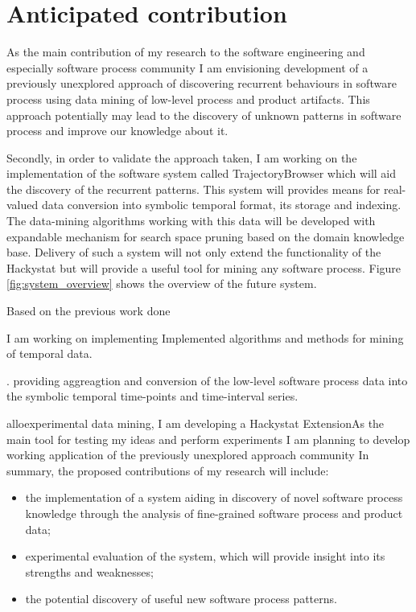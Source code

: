 \chapter{Anticipated contribution} \label{contribution}
As the main contribution of my research to the software engineering and especially software process community I am envisioning development of a previously unexplored approach of discovering recurrent behaviours in software process using data mining of low-level process and product artifacts. This approach potentially may lead to the discovery of unknown patterns in software process and improve our knowledge about it.

Secondly, in order to validate the approach taken, I am working on the implementation of the software system called TrajectoryBrowser which will aid the discovery of the recurrent patterns. This system will provides means for real-valued data conversion into symbolic temporal format, its storage and indexing. The data-mining algorithms working with this data will be developed with expandable mechanism for search space pruning based on the domain knowledge base. Delivery of such a system will not only extend the functionality of the Hackystat but will provide a useful tool for mining any software process. Figure \ref{fig:system_overview} shows the overview of the future system.

Based on the previous work done 





I am working on implementing Implemented algorithms and methods for mining of temporal data. 

. providing aggreagtion and conversion of the low-level software process data into the symbolic temporal time-points and time-interval series. 


alloexperimental data mining, I am developing a Hackystat ExtensionAs the main tool for testing my ideas and perform experiments I am planning to develop working application of the previously unexplored approach community In summary, the proposed contributions of my research will include: 


\begin{itemize}
	\item the implementation of a system aiding in discovery of novel software process knowledge through the analysis of fine-grained software process and product data;
	\item experimental evaluation of the system, which will provide insight into its strengths and weaknesses;
	\item the potential discovery of useful new software process patterns.
\end{itemize}

